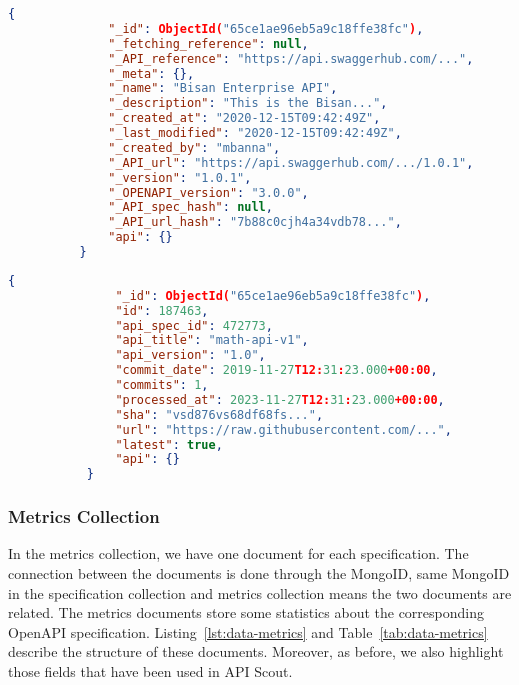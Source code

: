 \begin{lstlisting}[label={lst:data-swaggerhub},language=json,caption={Structure of the data coming from SwaggerHub},captionpos=b]
          {
              "_id": ObjectId("65ce1ae96eb5a9c18ffe38fc"),
              "_fetching_reference": null,
              "_API_reference": "https://api.swaggerhub.com/...",
              "_meta": {},
              "_name": "Bisan Enterprise API",
              "_description": "This is the Bisan...",
              "_created_at": "2020-12-15T09:42:49Z",
              "_last_modified": "2020-12-15T09:42:49Z",
              "_created_by": "mbanna",
              "_API_url": "https://api.swaggerhub.com/.../1.0.1",
              "_version": "1.0.1",
              "_OPENAPI_version": "3.0.0",
              "_API_spec_hash": null,
              "_API_url_hash": "7b88c0cjh4a34vdb78...",
              "api": {}
          }
\end{lstlisting}

\begin{lstlisting}[label={lst:data-github},language=json,caption={Structure of the data coming from GitHub},captionpos=b]
           {
               "_id": ObjectId("65ce1ae96eb5a9c18ffe38fc"),
               "id": 187463,
               "api_spec_id": 472773,
               "api_title": "math-api-v1",
               "api_version": "1.0",
               "commit_date": 2019-11-27T12:31:23.000+00:00,
               "commits": 1,
               "processed_at": 2023-11-27T12:31:23.000+00:00,
               "sha": "vsd876vs68df68fs...",
               "url": "https://raw.githubusercontent.com/...",
               "latest": true,
               "api": {}
           }
\end{lstlisting}

\subsubsection{Metrics Collection}
In the metrics collection, we have one document for each specification.
The connection between the documents is done through the MongoID, same MongoID in the specification collection and metrics collection means the two documents are related.
The metrics documents store some statistics about the corresponding OpenAPI specification.
Listing~\ref{lst:data-metrics} and Table~\ref{tab:data-metrics} describe the structure of these documents.
Moreover, as before, we also highlight those fields that have been used in API Scout.

